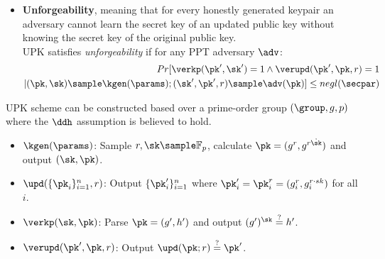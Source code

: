 \begin{itemize}
    \item \textbf{Unforgeability}, meaning that for every honestly generated keypair an adversary cannot learn the secret key of an updated public key without knowing the secret key of the original public key. \\
    UPK satisfies \emph{unforgeability} if for any PPT adversary $\adv$:
    \begin{align*}
        Pr[\verkp(\pk', \sk') = 1 \land \verupd(\pk', \pk, r) = 1 \\
        | (\pk,\sk) \sample \kgen(\params); (\sk', \pk', r) \sample \adv(\pk)] \leq negl(\secpar)
    \end{align*}
\end{itemize}

UPK scheme can be constructed based over a prime-order group $(\group, g, p)$ where the $\ddh$ assumption is believed to hold. 
\begin{itemize}
    \item $\kgen(\params)$: Sample $r, \sk \sample \mathbb{F}_p$, calculate $\pk = (g^r, g^{r \dot \sk})$ and output $(\sk,\pk)$.
    \item $\upd(\{ \pk_i \}_{i=1}^n, r)$: Output $\{ \pk'_i \}_{i=1}^n$ where $\pk'_i = \pk_i ^ r = (g_i^r, g_i^{r \cdot sk})$ for all $i$.
    \item $\verkp(\sk,\pk)$: Parse $\pk=(g',h')$ and output $(g')^\sk \overset{?}{=} h'$.
    \item $\verupd(\pk', \pk, r)$: Output $\upd(\pk;r) \overset{?}{=} \pk'$.
\end{itemize}



